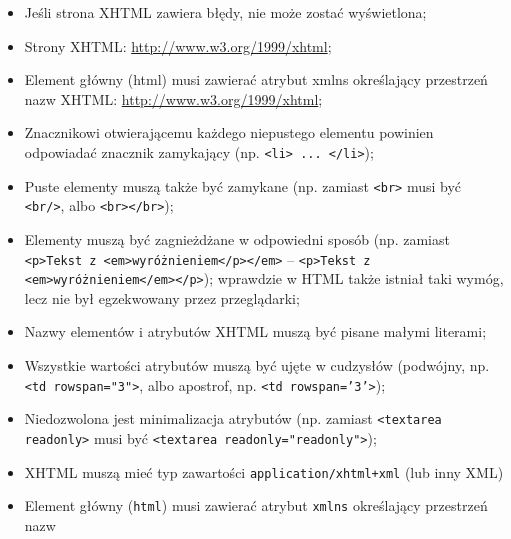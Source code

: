 \begin{itemize}
\item Jeśli strona XHTML zawiera błędy, nie może zostać wyświetlona;
\item Strony XHTML: \url{http://www.w3.org/1999/xhtml};
\item Element główny (html) musi zawierać atrybut xmlns określający przestrzeń nazw XHTML: \url{http://www.w3.org/1999/xhtml};
\item Znacznikowi otwierającemu każdego niepustego elementu powinien odpowiadać znacznik zamykający (np. \texttt{<li> ... </li>});
\item Puste elementy muszą także być zamykane (np. zamiast \texttt{<br>} musi być \texttt{<br/>}, albo \texttt{<br></br>});
\item Elementy muszą być zagnieżdżane w odpowiedni sposób (np. zamiast \texttt{<p>Tekst z <em>wyróżnieniem</p></em>} – \texttt{<p>Tekst z <em>wyróżnieniem</em></p>}); wprawdzie w HTML także istniał taki wymóg, lecz nie był egzekwowany przez przeglądarki;
\item Nazwy elementów i atrybutów XHTML muszą być pisane małymi literami;
\item Wszystkie wartości atrybutów muszą być ujęte w cudzysłów (podwójny, np. \texttt{<td rowspan="3">}, albo apostrof, np. \texttt{<td rowspan='3'>});
\item Niedozwolona jest minimalizacja atrybutów (np. zamiast \texttt{<textarea readonly>} musi być \texttt{<textarea readonly="readonly">});
\item XHTML muszą mieć typ zawartości \texttt{application/xhtml+xml} (lub inny XML)
\item Element główny (\texttt{html}) musi zawierać atrybut \texttt{xmlns} określający przestrzeń nazw  
\end{itemize}
